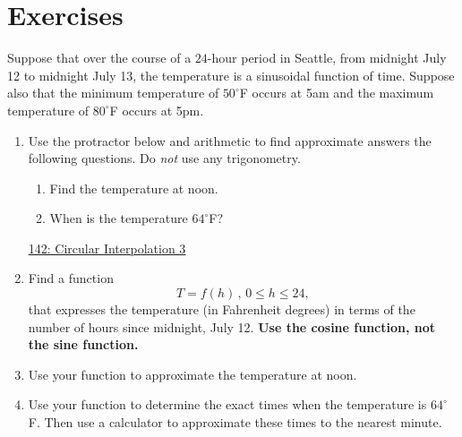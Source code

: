 \documentclass{ximera}
\begin{document}
\section{Exercises}
\begin{exercise} \label{ExPOfdgryreer}

Suppose that over the course of a $24$-hour period in Seattle, from midnight July 12 to midnight July 13, the temperature is a sinusoidal function of time. Suppose also that the minimum temperature of $50^\circ$F occurs at 5am and the maximum temperature of $80^\circ$F occurs at 5pm. 

\begin{enumerate}
\item Use the protractor below and arithmetic to find approximate answers the following questions. Do \emph{not} use any trigonometry.

\begin{enumerate}
\item Find the temperature at noon.

\item When is the temperature $64^\circ$F?
\end{enumerate}


\begin{onlineOnly}
    \begin{center}
\end{center}
\end{onlineOnly}

\href{https://www.desmos.com/calculator/0bywoftlld}{142: Circular Interpolation 3}


\item Find a function
\[
 T = f(h) \, , \, 0\leq h \leq 24,
\]
that expresses the temperature (in Fahrenheit degrees) in terms of the number of hours since midnight, July 12. {\bf Use the cosine function, not the sine function.}

\item Use your function to approximate the temperature at noon.

\item Use your function to determine the exact times when the temperature is $64^\circ$F. Then use a calculator to approximate these times to the nearest minute.

\end{enumerate}
\end{exercise}
\end{document}
